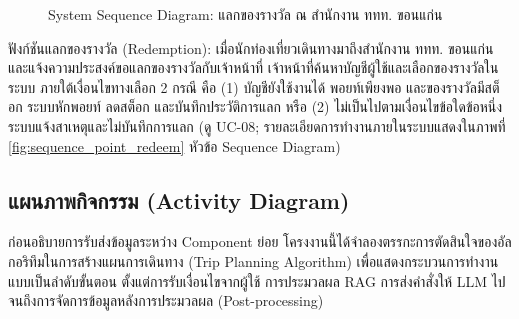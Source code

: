 \begin{figure}[H]
\centering
{}
\caption{System Sequence Diagram: แลกของรางวัล ณ สำนักงาน ททท. ขอนแก่น}
\label{fig:ssd_point_redeem}
\end{figure}

ฟังก์ชันแลกของรางวัล (Redemption): เมื่อนักท่องเที่ยวเดินทางมาถึงสำนักงาน ททท. ขอนแก่นและแจ้งความประสงค์ขอแลกของรางวัลกับเจ้าหน้าที่ เจ้าหน้าที่ค้นหาบัญชีผู้ใช้และเลือกของรางวัลในระบบ ภายใต้เงื่อนไขทางเลือก 2 กรณี คือ (1) บัญชียังใช้งานได้ พอยท์เพียงพอ และของรางวัลมีสต็อก ระบบหักพอยท์ ลดสต็อก และบันทึกประวัติการแลก หรือ (2) ไม่เป็นไปตามเงื่อนไขข้อใดข้อหนึ่ง ระบบแจ้งสาเหตุและไม่บันทึกการแลก (ดู UC-08; รายละเอียดการทำงานภายในระบบแสดงในภาพที่ \ref{fig:sequence_point_redeem} หัวข้อ Sequence Diagram)

\subsection{แผนภาพกิจกรรม (Activity Diagram)}

ก่อนอธิบายการรับส่งข้อมูลระหว่าง Component ย่อย โครงงานนี้ได้จำลองตรรกะการตัดสินใจของอัลกอริทึมในการสร้างแผนการเดินทาง (Trip Planning Algorithm) เพื่อแสดงกระบวนการทำงานแบบเป็นลำดับขั้นตอน ตั้งแต่การรับเงื่อนไขจากผู้ใช้ การประมวลผล RAG การส่งคำสั่งให้ LLM ไปจนถึงการจัดการข้อมูลหลังการประมวลผล (Post-processing)

